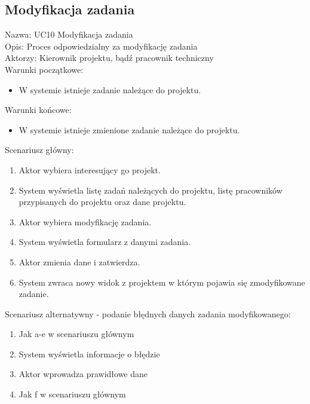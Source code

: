 \subsection{Modyfikacja zadania}
Nazwa: UC10 Modyfikacja zadania\\
Opis: Proces odpowiedzialny za modyfikację zadania\\
Aktorzy: Kierownik projektu, bądź pracownik techniczny \\
Warunki początkowe:
\begin{itemize}
\item W systemie istnieje zadanie należące do projektu.
\end{itemize}
Warunki końcowe:
\begin{itemize}
\item W systemie istnieje zmienione zadanie należące do projektu.
\end{itemize}
Scenariusz główny:
\begin{enumerate}
\item Aktor wybiera interesujący go projekt.
\item System wyświetla listę zadań należących do projektu, listę pracowników przypisanych do projektu oraz dane projektu.
\item Aktor wybiera modyfikację zadania.
\item System wyświetla formularz z danymi zadania.
\item Aktor zmienia dane i zatwierdza.
\item System zwraca nowy widok z projektem w którym pojawia się zmodyfikowane zadanie.
\end{enumerate}
Scenariusz alternatywny - podanie błędnych danych zadania modyfikowanego: 
\begin{enumerate}
\item Jak a-e w scenariuszu głównym
\item System wyświetla informacje o błędzie
\item Aktor wprowadza prawidłowe dane
\item Jak f w scenariuszu głównym
\end{enumerate}

